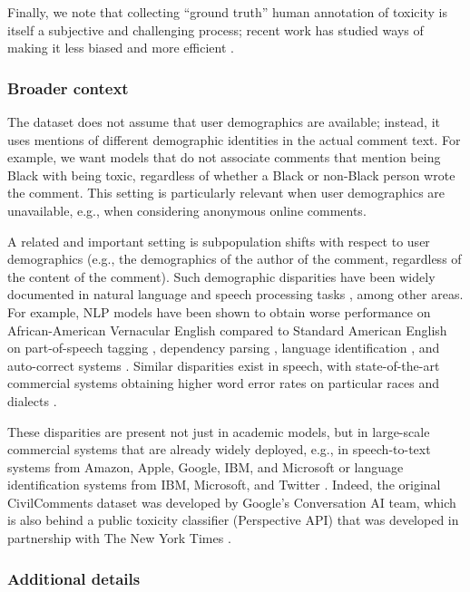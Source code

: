 Finally, we note that collecting ``ground truth'' human annotation of toxicity is itself a subjective and challenging process; recent work has studied ways of making it less biased and more efficient \citep{sap2019risk, han2020fortifying}.

\subsubsection{Broader context}
The \CivilComments dataset does not assume that user demographics are available; instead, it uses mentions of different demographic identities in the actual comment text.
For example, we want models that do not associate comments that mention being Black with being toxic, regardless of whether a Black or non-Black person wrote the comment.
This setting is particularly relevant when user demographics are unavailable, e.g., when considering anonymous online comments.

A related and important setting is subpopulation shifts with respect to user demographics (e.g., the demographics of the author of the comment, regardless of the content of the comment).
Such demographic disparities have been widely documented in natural language and speech processing tasks \citep{hovy2016social}, among other areas.
For example, NLP models have been shown to obtain worse performance on African-American Vernacular English compared to Standard American English on
part-of-speech tagging \citep{jorgensen2015},
dependency parsing \citep{blodgett2016},
language identification \citep{blodgett2017racial},
and auto-correct systems \citep{hashimoto2018repeated}.
Similar disparities exist in speech, with state-of-the-art commercial systems obtaining higher word error rates on particular races \citep{koenecke2020racial} and dialects \citep{tatman2017}.

These disparities are present not just in academic models, but in large-scale commercial systems that are already widely deployed, e.g., in speech-to-text systems from Amazon, Apple, Google, IBM, and Microsoft \citep{tatman2017, koenecke2020racial} or language identification systems from IBM, Microsoft, and Twitter \citep{blodgett2017racial}.
Indeed, the original CivilComments dataset was developed by Google's Conversation AI team, which is also behind a public toxicity classifier (Perspective API) that was developed in partnership with The New York Times \citep{nyt2016jigsaw}.

\subsubsection{Additional details}\label{sec:app_civilcomments_details}

